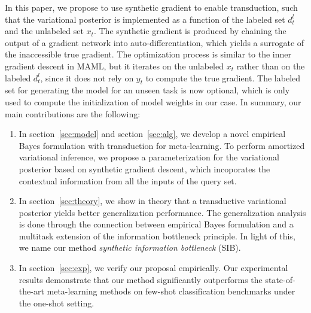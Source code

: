 \documentclass{article} \usepackage{iclr2020_conference,times}
\newcommand{\supp}{l}
\begin{document}
In this paper, we propose to use synthetic gradient \citep{jaderberg2017decoupled} 
to enable transduction, such that the variational posterior is implemented as a function of the labeled set $d_t^\supp$ and the unlabeled set $x_t$.
The synthetic gradient is produced by chaining the output of a gradient network into auto-differentiation, 
which yields a surrogate of the inaccessible true gradient.
The optimization process is similar to the inner gradient descent in MAML, but it iterates on the unlabeled $x_t$ rather than on the labeled $d_t^\supp$,
since it does not rely on $y_t$ to compute the true gradient.
The labeled set for generating the model for an unseen task is now optional, which is only used to compute the initialization of model weights in our case. In summary, our main contributions are the following:   
\begin{enumerate}
    \item In section~\ref{sec:model} and section~\ref{sec:alg}, 
        we develop a novel empirical Bayes formulation with transduction for meta-learning.
        To perform amortized variational inference, we propose a parameterization for the variational posterior 
        based on synthetic gradient descent, which incoporates the contextual information from all the inputs of the query set.
    \item In section~\ref{sec:theory}, we show in theory that a transductive variational posterior yields better generalization performance.
        The generalization analysis is done through the connection between empirical Bayes formulation and
        a multitask extension of the information bottleneck principle.
        In light of this, we name our method \emph{synthetic information bottleneck} (SIB).
    \item In section~\ref{sec:exp}, we verify our proposal empirically. 
        Our experimental results demonstrate that our method significantly outperforms the state-of-the-art meta-learning methods 
        on few-shot classification benchmarks under the one-shot setting. 
\end{enumerate}
\end{document}
